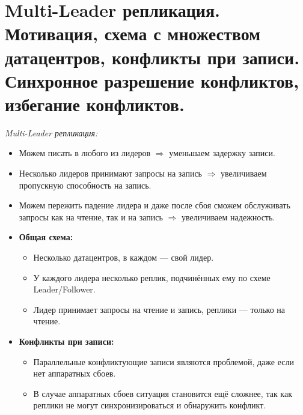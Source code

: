 \section{Multi-Leader репликация. Мотивация, схема с множеством датацентров, конфликты при записи. Синхронное разрешение конфликтов, избегание конфликтов.}

\begin{definition}
    \textit{Multi-Leader репликация:}
    \begin{itemize}
        \item Можем писать в любого из лидеров $\Rightarrow$ уменьшаем задержку записи.
        \item Несколько лидеров принимают запросы на запись $\Rightarrow$ увеличиваем пропускную способность на запись.
        \item Можем пережить падение лидера и даже после сбоя сможем обслуживать запросы как на чтение, так и на запись $\Rightarrow$ увеличиваем надежность.

        \item \textbf{Общая схема:}
        \begin{itemize}
            \item Несколько датацентров, в каждом --- свой лидер.
            \item У каждого лидера несколько реплик, подчинённых ему по схеме Leader/Follower.
            \item Лидер принимает запросы на чтение и запись, реплики --- только на чтение.
        \end{itemize}

        \item \textbf{Конфликты при записи:}
        \begin{itemize}
            \item Параллельные конфликтующие записи являются проблемой, даже если нет аппаратных сбоев.
            \item В случае аппаратных сбоев ситуация становится ещё сложнее, так как реплики не могут синхронизироваться и обнаружить конфликт.
        \end{itemize}
    \end{itemize}

\end{definition}

